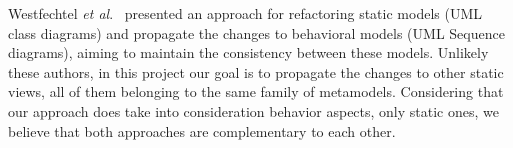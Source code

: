 






Westfechtel \textit{et al}.~\cite{ICSOFT2014_Winetzhammer} presented an approach for refactoring static models (UML class diagrams) and propagate the changes to behavioral models (UML Sequence diagrams), aiming to maintain the consistency between these models. Unlikely these authors, in this project our goal is to propagate the changes to other static views, all of them belonging to the same family of metamodels. Considering that our approach does take into consideration behavior aspects, only static ones, we believe that both approaches are complementary to each other.

